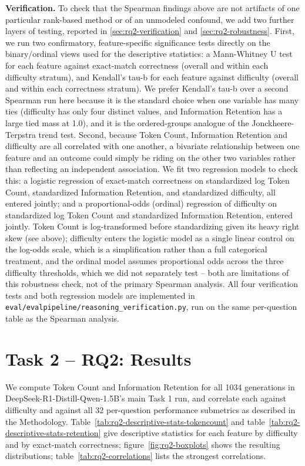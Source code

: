 \textbf{Verification.} To check that the Spearman findings above are not artifacts of one particular rank-based method or of an unmodeled confound, we add two further layers of testing, reported in \ref{sec:rq2-verification} and \ref{sec:rq2-robustness}. First, we run two confirmatory, feature-specific significance tests directly on the binary/ordinal views used for the descriptive statistics: a Mann-Whitney U test for each feature against exact-match correctness (overall and within each difficulty stratum), and Kendall's tau-b for each feature against difficulty (overall and within each correctness stratum). We prefer Kendall's tau-b over a second Spearman run here because it is the standard choice when one variable has many ties (difficulty has only four distinct values, and Information Retention has a large tied mass at 1.0), and it is the ordered-groups analogue of the Jonckheere-Terpstra trend test. Second, because Token Count, Information Retention and difficulty are all correlated with one another, a bivariate relationship between one feature and an outcome could simply be riding on the other two variables rather than reflecting an independent association. We fit two regression models to check this: a logistic regression of exact-match correctness on standardized log Token Count, standardized Information Retention, and standardized difficulty, all entered jointly; and a proportional-odds (ordinal) regression of difficulty on standardized log Token Count and standardized Information Retention, entered jointly. Token Count is log-transformed before standardizing given its heavy right skew (see above); difficulty enters the logistic model as a single linear control on the log-odds scale, which is a simplification rather than a full categorical treatment, and the ordinal model assumes proportional odds across the three difficulty thresholds, which we did not separately test -- both are limitations of this robustness check, not of the primary Spearman analysis. All four verification tests and both regression models are implemented in \texttt{eval/evalpipeline/reasoning\_verification.py}, run on the same per-question table as the Spearman analysis.

\section{Task 2 -- RQ2: Results}
\label{sec:rq2-results}

We compute Token Count and Information Retention for all 1034 generations in DeepSeek-R1-Distill-Qwen-1.5B's main Task 1 run, and correlate each against difficulty and against all 32 per-question performance submetrics as described in the Methodology. Table~\ref{tab:rq2-descriptive-stats-tokencount} and table~\ref{tab:rq2-descriptive-stats-retention} give descriptive statistics for each feature by difficulty and by exact-match correctness; figure~\ref{fig:rq2-boxplots} shows the resulting distributions; table~\ref{tab:rq2-correlations} lists the strongest correlations.

